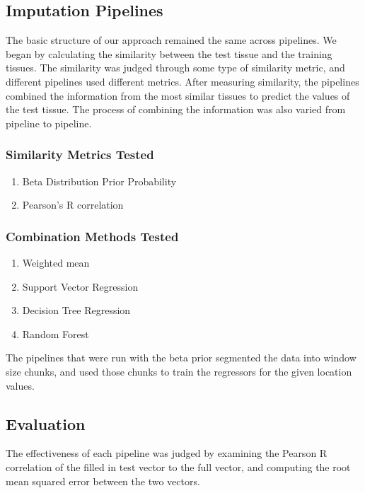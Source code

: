 \documentclass{article} %
\begin{document}
\subsection{Imputation Pipelines}
The basic structure of our approach remained the same across pipelines. We began by calculating the similarity between the test tissue and the training tissues. The similarity was judged through some type of similarity metric, and different pipelines used different metrics. After measuring similarity, the pipelines combined the information from the most similar tissues to predict the values of the test tissue. The process of combining the information was also varied from pipeline to pipeline.
\subsubsection{Similarity Metrics Tested}
\begin{enumerate}
	\item Beta Distribution Prior Probability
	\item Pearson's R correlation
\end{enumerate}

\subsubsection{Combination Methods Tested}
\begin{enumerate}
	\item Weighted mean
	\item Support Vector Regression
	\item Decision Tree Regression
	\item Random Forest
\end{enumerate}

The pipelines that were run with the beta prior segmented the data into window size chunks, and used those chunks to train the regressors for the given location values.

\subsection{Evaluation}
The effectiveness of each pipeline was judged by examining the Pearson R correlation of the filled in test vector to the full vector, and computing the root mean squared error between the two vectors.
\end{document}
